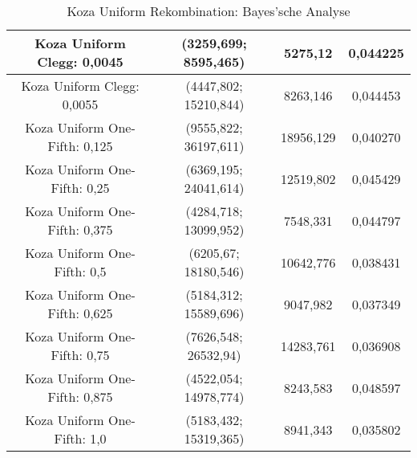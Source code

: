\begin{table}[H]
\begin{tabular}{c | c | c | c}
		\hline
		Koza Uniform Clegg: 0,0045 & (3259,699; 8595,465) & 5275,12 & 0,044225\\
		\hline
		Koza Uniform Clegg: 0,0055 & (4447,802; 15210,844) & 8263,146 & 0,044453\\
		\hline
		Koza Uniform One-Fifth: 0,125 & (9555,822; 36197,611) & 18956,129 & 0,040270\\
		\hline
		Koza Uniform One-Fifth: 0,25 & (6369,195; 24041,614) & 12519,802 & 0,045429\\
		\hline
		Koza Uniform One-Fifth: 0,375 & (4284,718; 13099,952) & 7548,331 & 0,044797\\
		\hline
		Koza Uniform One-Fifth: 0,5 & (6205,67; 18180,546) & 10642,776 & 0,038431\\
		\hline
		Koza Uniform One-Fifth: 0,625 & (5184,312; 15589,696) & 9047,982 & 0,037349\\
		\hline
		Koza Uniform One-Fifth: 0,75 & (7626,548; 26532,94) & 14283,761 & 0,036908\\
		\hline
		Koza Uniform One-Fifth: 0,875 & (4522,054; 14978,774) & 8243,583 & 0,048597\\
		\hline
		Koza Uniform One-Fifth: 1,0 & (5183,432; 15319,365) & 8941,343 & 0,035802\\
	\end{tabular}
	\caption{Koza Uniform Rekombination: Bayes'sche Analyse}
	\label{table:kozaUniformBayesian}
\end{table}


